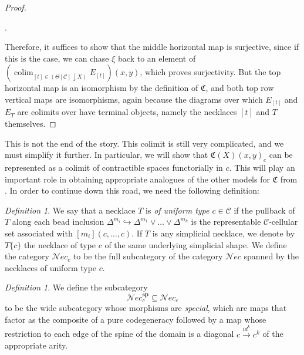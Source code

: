 \documentclass{amsart}
\numberwithin{equation}{section}
\theoremstyle{plain}   %
\theoremstyle{remark}
\newtheorem{defn}[subsection]{Definition}
\theoremstyle{plain}
\DeclareMathOperator{\colim}{colim}
\newcommand{\Nec}{\ensuremath{{\mathcal{N}ec}}}
\newcommand{\overcat}[2]{{\left(#1\downarrow #2\right)}}
\newcommand{\C}{\ensuremath{\mathcal{C}}}
\begin{document}
\begin{proof}
\begin{center}
.
	\end{center}
	Therefore, it suffices to show that the middle horizontal map is surjective, since if this is the case, we can chase \(\xi\) back to an element of \(\left( \colim_{[t]\in \overcat{\Theta[\C]}{X}} E_{[t]}\right)(x,y)\), which proves surjectivity.  But the top horizontal map is an isomorphism by the definition of \(\mathfrak{C}\), and both top row vertical maps are isomorphisms, again because the diagrams over which \(E_{[t]}\) and \(E_T\) are colimits over have terminal objects, namely the necklaces \([t]\) and \(T\) themselves.
\end{proof}

This is not the end of the story.  This colimit is still very complicated, and we must simplify it further.  In particular, we will show that \(\mathfrak{C}(X)(x,y)_c\) can be represented as a colimit of contractible spaces functorially in \(c\).  This will play an important role in obtaining appropriate analogues of the other models for \(\mathfrak{C}\) from \cite{ds1}.  In order to continue down this road, we need the following definition:

\begin{defn}
	We say that a necklace \(T\) is \emph{of uniform type \(c\in \C\)} if the pullback of \(T\) along each bead inclusion \(\Delta^{m_i}\hookrightarrow \Delta^{m_1}\vee \dots \vee \Delta^{m_k}\) is the representable \(\C\)-cellular set associated with \([m_i](c,\dots,c)\).  If \(T\) is any simplicial necklace, we denote by \(T\{c\}\) the necklace of type \(c\) of the same underlying simplicial shape. We define the category \(\Nec_c\) to be the full subcategory of the category \(\Nec\) spanned by the necklaces of uniform type \(c\).
\end{defn}

\begin{defn}
	We define the subcategory \[\Nec^\mathbf{sp}_c\subseteq \Nec_c\] to be the wide subcategory whose morphisms are \emph{special}, which are maps that factor as the composite of a pure codegeneracy followed by a map whose restriction to each edge of the spine of the domain is a diagonal \(c\xrightarrow{id^k} c^k\) of the appropriate arity.
\end{defn}
\end{document}
